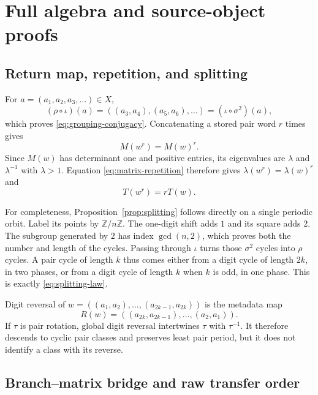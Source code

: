 \section{Full algebra and source-object proofs}
\label{app:proofs}

\subsection{Return map, repetition, and splitting}
\label{app:return-proof}

For $a=(a_1,a_2,a_3,\ldots)\in X$,
\[
  (\rho\circ\iota)(a)
  =((a_3,a_4),(a_5,a_6),\ldots)
  =(\iota\circ\sigma^2)(a),
\]
which proves \eqref{eq:grouping-conjugacy}.  Concatenating a stored pair word
$r$ times gives
\begin{equation}
  M(w^r)=M(w)^r.
  \label{eq:matrix-repetition}
\end{equation}
Since $M(w)$ has determinant one and positive entries, its eigenvalues are
$\lambda$ and $\lambda^{-1}$ with $\lambda>1$.  Equation
\eqref{eq:matrix-repetition} therefore gives
$\lambda(w^r)=\lambda(w)^r$ and
\begin{equation}
  T(w^r)=rT(w).
  \label{eq:roof-repetition}
\end{equation}

For completeness, Proposition~\ref{prop:splitting} follows directly on a
single periodic orbit.  Label its points by $\mathbb Z/n\mathbb Z$.  The
one-digit shift adds $1$ and its square adds $2$.  The subgroup generated by
$2$ has index $\gcd(n,2)$, which proves both the number and length of the
cycles.  Passing through $\iota$ turns those $\sigma^2$ cycles into $\rho$
cycles.  A pair cycle of length $k$ thus comes either from a digit cycle of
length $2k$, in two phases, or from a digit cycle of length $k$ when $k$ is
odd, in one phase.  This is exactly \eqref{eq:splitting-law}.

Digit reversal of
$w=((a_1,a_2),\ldots,(a_{2k-1},a_{2k}))$ is the metadata map
\[
  R(w)=((a_{2k},a_{2k-1}),\ldots,(a_2,a_1)).
\]
If $\tau$ is pair rotation, global digit reversal intertwines $\tau$ with
$\tau^{-1}$.  It therefore descends to cyclic pair classes and preserves
least pair period, but it does not identify a class with its reverse.

\subsection{Branch--matrix bridge and raw transfer order}
\label{app:branch-proof}

